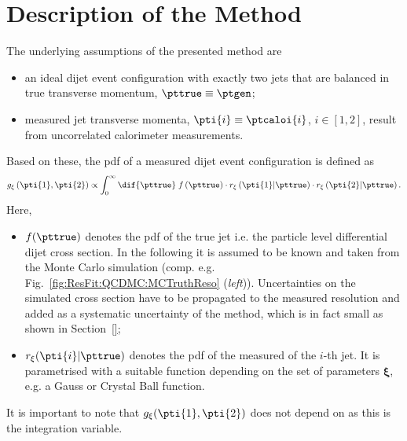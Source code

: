 

\section{Description of the Method}\label{sec:ResFit:Method}


The underlying assumptions of the presented method are
\begin{itemize}
\item an ideal dijet event configuration with exactly two jets that
  are balanced in true transverse momentum, \mbox{$\pttrue\equiv\ptgen$};
\item measured jet transverse momenta,
  \mbox{$\pti{i}\equiv\ptcaloi{i}$}, $i\in[1,2]$, result from uncorrelated
  calorimeter measurements.
\end{itemize}
Based on these, the pdf of a measured dijet event configuration is defined as
\begin{equation}
  \label{eq:ResFit:DijetPdf}
  g_{\mathbf{\xi}}\left(\pti{1},\pti{2}\right) \propto \int^{\infty}_{0}\dif{\pttrue}\;f\left(\pttrue\right)
  \cdot r_{\mathbf{\xi}}\left(\pti{1}|\pttrue\right)
  \cdot r_{\mathbf{\xi}}\left(\pti{2}|\pttrue\right).
\end{equation}
Here,
\begin{itemize}
\item $f(\pttrue)$ denotes the pdf of the true jet \pt
  i.e. the particle level differential dijet cross section.
  In the following it is assumed to be known
  and taken from the Monte Carlo simulation
  (comp. e.g. Fig.~\ref{fig:ResFit:QCDMC:MCTruthReso} (\textit{left})).
  Uncertainties on the simulated cross section have to be propagated to
  the measured resolution and added as a systematic uncertainty of the
  method, which is in fact small as shown in Section~\ref{};
\item $r_{\mathbf{\xi}}(\pti{i}|\pttrue)$ denotes the pdf of the measured \pt
  of the $i$-th jet.
  It is parametrised with a suitable function depending on the set of
  parameters $\mathbf{\xi}$, e.g. a Gauss or Crystal Ball function.
\end{itemize}
It is important to note that
$g_{\mathbf{\xi}}(\pti{1},\pti{2})$ does not depend on \pttrue
as this is the integration variable.

